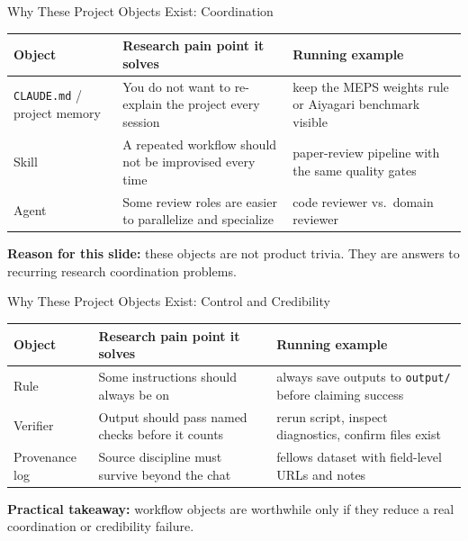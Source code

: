 \documentclass[10pt,english,aspectratio=169]{beamer}
\begin{document}
\begin{frame}{Why These Project Objects Exist: Coordination}
\begin{center}
\small
\begin{tabular}{|p{2.1cm}|p{4.2cm}|p{4.1cm}|}
\hline
\textbf{Object} & \textbf{Research pain point it solves} & \textbf{Running example} \\ \hline
\texttt{CLAUDE.md} / project memory & You do not want to re-explain the project every session & keep the MEPS weights rule or Aiyagari benchmark visible \\ \hline
Skill & A repeated workflow should not be improvised every time & paper-review pipeline with the same quality gates \\ \hline
Agent & Some review roles are easier to parallelize and specialize & code reviewer vs.\ domain reviewer \\ \hline
\end{tabular}
\end{center}

\vspace{0.25cm}
\textbf{Reason for this slide:} these objects are not product trivia. They are answers to recurring research coordination problems.
\end{frame}

\begin{frame}{Why These Project Objects Exist: Control and Credibility}
\begin{center}
\small
\begin{tabular}{|p{2.1cm}|p{4.2cm}|p{4.1cm}|}
\hline
\textbf{Object} & \textbf{Research pain point it solves} & \textbf{Running example} \\ \hline
Rule & Some instructions should always be on & always save outputs to \texttt{output/} before claiming success \\ \hline
Verifier & Output should pass named checks before it counts & rerun script, inspect diagnostics, confirm files exist \\ \hline
Provenance log & Source discipline must survive beyond the chat & fellows dataset with field-level URLs and notes \\ \hline
\end{tabular}
\end{center}

\vspace{0.25cm}
\textbf{Practical takeaway:} workflow objects are worthwhile only if they reduce a real coordination or credibility failure.
\end{frame}
\end{document}
